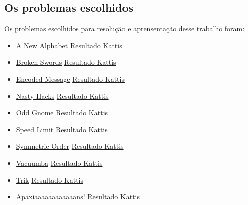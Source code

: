 \documentclass[hidelinks]{article}
\begin{document}
        \subsection{Os problemas escolhidos}
            Os problemas escolhidos para resolução e aprensentação desse trabalho foram:
            \begin{itemize}
                \item \href{https://open.kattis.com/problems/anewalphabet}{A New Alphabet}
                    \subitem \href{https://open.kattis.com/submissions/5468063}{Resultado Kattis}
                \item \href{https://open.kattis.com/problems/brokenswords}{Broken Swords}
                    \subitem \href{https://open.kattis.com/submissions/5467655}{Resultado Kattis}
                \item \href{https://open.kattis.com/problems/encodedmessage}{Encoded Message}
                    \subitem \href{https://open.kattis.com/submissions/5464102}{Resultado Kattis}
                \item \href{https://open.kattis.com/problems/nastyhacks}{Nasty Hacks}
                    \subitem \href{https://open.kattis.com/submissions/5463684}{Resultado Kattis}
                \item \href{https://open.kattis.com/problems/oddgnome}{Odd Gnome}
                    \subitem \href{https://open.kattis.com/submissions/5464256}{Resultado Kattis}
                \item \href{https://open.kattis.com/problems/speedlimit}{Speed Limit}
                    \subitem \href{https://open.kattis.com/submissions/5463805}{Resultado Kattis}
                \item \href{https://open.kattis.com/problems/symmetricorder}{Symmetric Order}
                    \subitem \href{https://open.kattis.com/submissions/5464202}{Resultado Kattis}
                \item \href{https://open.kattis.com/problems/vacuumba}{Vacuumba}
                    \subitem \href{https://open.kattis.com/submissions/5467802}{Resultado Kattis}
                \item \href{https://open.kattis.com/problems/trik}{Trik}
                    \subitem \href{https://open.kattis.com/submissions/5892564}{Resultado Kattis}
                \item \href{https://open.kattis.com/problems/apaxiaaans}{Apaxiaaaaaaaaaaaans!}
                    \subitem \href{https://open.kattis.com/submissions/5892569}{Resultado Kattis}
            \end{itemize}
\end{document}
